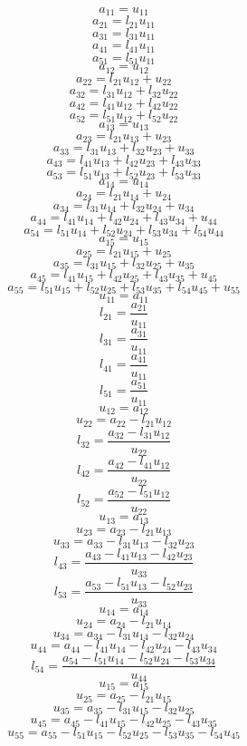 \documentclass[10pt,a4paper,dvipdfmx]{article}
\begin{document}
\begin{multicols}{2}
$$ a_{{1}{1}} = u_{{1}{1}} $$
$$ a_{{2}{1}} = l_{{2}{1}} u_{{1}{1}} $$
$$ a_{{3}{1}} = l_{{3}{1}} u_{{1}{1}} $$
$$ a_{{4}{1}} = l_{{4}{1}} u_{{1}{1}} $$
$$ a_{{5}{1}} = l_{{5}{1}} u_{{1}{1}} $$
$$ a_{{1}{2}} = u_{{1}{2}} $$
$$ a_{{2}{2}} = l_{{2}{1}} u_{{1}{2}} + u_{{2}{2}} $$
$$ a_{{3}{2}} = l_{{3}{1}} u_{{1}{2}} + l_{{3}{2}} u_{{2}{2}} $$
$$ a_{{4}{2}} = l_{{4}{1}} u_{{1}{2}} + l_{{4}{2}} u_{{2}{2}} $$
$$ a_{{5}{2}} = l_{{5}{1}} u_{{1}{2}} + l_{{5}{2}} u_{{2}{2}} $$
$$ a_{{1}{3}} = u_{{1}{3}} $$
$$ a_{{2}{3}} = l_{{2}{1}} u_{{1}{3}} + u_{{2}{3}} $$
$$ a_{{3}{3}} = l_{{3}{1}} u_{{1}{3}} + l_{{3}{2}} u_{{2}{3}} + u_{{3}{3}} $$
$$ a_{{4}{3}} = l_{{4}{1}} u_{{1}{3}} + l_{{4}{2}} u_{{2}{3}} + l_{{4}{3}} u_{{3}{3}} $$
$$ a_{{5}{3}} = l_{{5}{1}} u_{{1}{3}} + l_{{5}{2}} u_{{2}{3}} + l_{{5}{3}} u_{{3}{3}} $$
$$ a_{{1}{4}} = u_{{1}{4}} $$
$$ a_{{2}{4}} = l_{{2}{1}} u_{{1}{4}} + u_{{2}{4}} $$
$$ a_{{3}{4}} = l_{{3}{1}} u_{{1}{4}} + l_{{3}{2}} u_{{2}{4}} + u_{{3}{4}} $$
$$ a_{{4}{4}} = l_{{4}{1}} u_{{1}{4}} + l_{{4}{2}} u_{{2}{4}} + l_{{4}{3}} u_{{3}{4}} + u_{{4}{4}} $$
$$ a_{{5}{4}} = l_{{5}{1}} u_{{1}{4}} + l_{{5}{2}} u_{{2}{4}} + l_{{5}{3}} u_{{3}{4}} + l_{{5}{4}} u_{{4}{4}} $$
$$ a_{{1}{5}} = u_{{1}{5}} $$
$$ a_{{2}{5}} = l_{{2}{1}} u_{{1}{5}} + u_{{2}{5}} $$
$$ a_{{3}{5}} = l_{{3}{1}} u_{{1}{5}} + l_{{3}{2}} u_{{2}{5}} + u_{{3}{5}} $$
$$ a_{{4}{5}} = l_{{4}{1}} u_{{1}{5}} + l_{{4}{2}} u_{{2}{5}} + l_{{4}{3}} u_{{3}{5}} + u_{{4}{5}} $$
$$ a_{{5}{5}} = l_{{5}{1}} u_{{1}{5}} + l_{{5}{2}} u_{{2}{5}} + l_{{5}{3}} u_{{3}{5}} + l_{{5}{4}} u_{{4}{5}} + u_{{5}{5}} $$
\vfill\null
\columnbreak
$$ u_{{1}{1}} = a_{{1}{1}} $$
$$ l_{{2}{1}} = \dfrac{a_{{2}{1}}}{u_{{1}{1}}} $$
$$ l_{{3}{1}} = \dfrac{a_{{3}{1}}}{u_{{1}{1}}} $$
$$ l_{{4}{1}} = \dfrac{a_{{4}{1}}}{u_{{1}{1}}} $$
$$ l_{{5}{1}} = \dfrac{a_{{5}{1}}}{u_{{1}{1}}} $$
$$ u_{{1}{2}} = a_{{1}{2}} $$
$$ u_{{2}{2}} = a_{{2}{2}}- l_{{2}{1}} u_{{1}{2}} $$
$$ l_{{3}{2}} = \dfrac{a_{{3}{2}}- l_{{3}{1}} u_{{1}{2}}}{u_{{2}{2}}} $$
$$ l_{{4}{2}} = \dfrac{a_{{4}{2}}- l_{{4}{1}} u_{{1}{2}}}{u_{{2}{2}}} $$
$$ l_{{5}{2}} = \dfrac{a_{{5}{2}}- l_{{5}{1}} u_{{1}{2}}}{u_{{2}{2}}} $$
$$ u_{{1}{3}} = a_{{1}{3}} $$
$$ u_{{2}{3}} = a_{{2}{3}}- l_{{2}{1}} u_{{1}{3}} $$
$$ u_{{3}{3}} = a_{{3}{3}}- l_{{3}{1}} u_{{1}{3}}- l_{{3}{2}} u_{{2}{3}} $$
$$ l_{{4}{3}} = \dfrac{a_{{4}{3}}- l_{{4}{1}} u_{{1}{3}}- l_{{4}{2}} u_{{2}{3}}}{u_{{3}{3}}} $$
$$ l_{{5}{3}} = \dfrac{a_{{5}{3}}- l_{{5}{1}} u_{{1}{3}}- l_{{5}{2}} u_{{2}{3}}}{u_{{3}{3}}} $$
$$ u_{{1}{4}} = a_{{1}{4}} $$
$$ u_{{2}{4}} = a_{{2}{4}}- l_{{2}{1}} u_{{1}{4}} $$
$$ u_{{3}{4}} = a_{{3}{4}}- l_{{3}{1}} u_{{1}{4}}- l_{{3}{2}} u_{{2}{4}} $$
$$ u_{{4}{4}} = a_{{4}{4}}- l_{{4}{1}} u_{{1}{4}}- l_{{4}{2}} u_{{2}{4}}- l_{{4}{3}} u_{{3}{4}} $$
$$ l_{{5}{4}} = \dfrac{a_{{5}{4}}- l_{{5}{1}} u_{{1}{4}}- l_{{5}{2}} u_{{2}{4}}- l_{{5}{3}} u_{{3}{4}}}{u_{{4}{4}}} $$
$$ u_{{1}{5}} = a_{{1}{5}} $$
$$ u_{{2}{5}} = a_{{2}{5}}- l_{{2}{1}} u_{{1}{5}} $$
$$ u_{{3}{5}} = a_{{3}{5}}- l_{{3}{1}} u_{{1}{5}}- l_{{3}{2}} u_{{2}{5}} $$
$$ u_{{4}{5}} = a_{{4}{5}}- l_{{4}{1}} u_{{1}{5}}- l_{{4}{2}} u_{{2}{5}}- l_{{4}{3}} u_{{3}{5}} $$
$$ u_{{5}{5}} = a_{{5}{5}}- l_{{5}{1}} u_{{1}{5}}- l_{{5}{2}} u_{{2}{5}}- l_{{5}{3}} u_{{3}{5}}- l_{{5}{4}} u_{{4}{5}} $$
\end{multicols}
\end{document}
